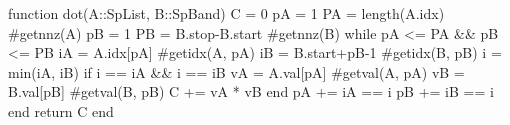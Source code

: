 \begin{juliacode} 
function dot(A::SpList, B::SpBand)
  C = 0
  pA = 1
  PA = length(A.idx) #getnnz(A)
  pB = 1
  PB = B.stop-B.start #getnnz(B)
  while pA <= PA && pB <= PB
    iA = A.idx[pA] #getidx(A, pA)
    iB = B.start+pB-1 #getidx(B, pB)
    i = min(iA, iB)
    if i == iA && i == iB
      vA = A.val[pA] #getval(A, pA)
      vB = B.val[pB] #getval(B, pB)
      C += vA * vB
    end
    pA += iA == i
    pB += iB == i
  end
  return C
end
\end{juliacode}